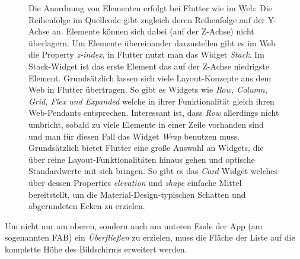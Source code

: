 \begin{figure}[H]
{        }
    \endminipage\hfill
    \vspace{0pt}
        Die Anordnung von Elementen erfolgt bei Flutter wie im Web:
        Die Reihenfolge im Quellcode gibt zugleich deren Reihenfolge auf
        der Y-Achse an. Elemente können sich dabei (auf der Z-Achse)
        nicht überlagern. Um Elemente übereinander darzustellen gibt es
        im Web die Property \textit{z-index}, in Flutter nutzt man das Widget
        \textit{Stack}. Im Stack-Widget ist das erste Element das auf der
        Z-Achse niedrigste Element. Grundsätzlich lassen sich viele
        Layout-Konzepte aus dem Web in Flutter übertragen. So gibt es
        Widgets wie \textit{Row, Column, Grid, Flex und Expanded} welche
        in ihrer Funktionalität gleich ihren Web-Pendants entsprechen.
        Interessant ist, dass \textit{Row} allerdings nicht umbricht,
        sobald zu viele Elemente in einer Zeile vorhanden sind und man
        für diesen Fall das Widget \textit{Wrap} benutzen muss.
        Grundsätzlich bietet Flutter eine große Auswahl an Widgets, die über
        reine Layout-Funktionalitäten hinaus gehen und optische Standardwerte
        mit sich bringen. So gibt es das \textit{Card}-Widget welches über
        dessen Properties \textit{elevation} und \textit{shape} einfache
        Mittel bereitstellt, um die Material-Design-typischen Schatten
        und abgerundeten Ecken zu erzielen.

    \endminipage\hfill
\end{figure}
Um nicht nur am oberen, sondern auch am unteren Ende der App
(am sogenannten \ac{FAB}) ein \textit{Überfließen} zu erzielen,
muss die Fläche der Liste auf die komplette Höhe des
Bildschirms erweitert werden.

